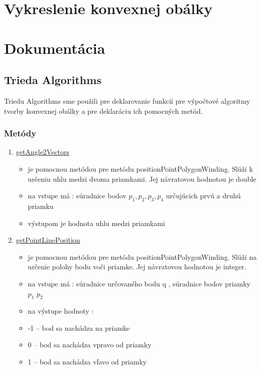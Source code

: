 \documentclass[12pt]{article}
\begin{document}

\section{Vykreslenie konvexnej obálky}




\section{Dokumentácia}
\subsection{Trieda Algorithms}
Triedu Algorithms sme použili pre deklarovanie funkcií pre výpočtové algoritmy tvorby konvexnej obálky a pre deklaráciu ich pomocných metód.

\subsubsection{Metódy}

\begin{enumerate}
\item[] \underline{getAngle2Vectors}
\begin{itemize}
\item je pomocnou metódou pre metódu positionPointPolygonWinding. Slúži k určeniu uhlu medzi dvoma priamkami. Jej návratovou hodnotou je double
\item na vstupe má : súradnice bodov $p_1, p_2, p_3, p_4$ určujúcich prvú a druhú priamku
\item výstupom je hodnota uhlu medzi priamkami 
\end{itemize}

\item[] \underline{getPointLinePosition}
\begin{itemize}
\item je pomocnou metódou pre metódu positionPointPolygonWinding. Slúži na určenie polohy bodu voči priamke. Jej návratovou hodnotou je integer.
\item na vstupe má : súradnice určovaného bodu q , súradnice bodov priamky $p_1$ $p_2$
\item na výstupe hodnoty :
\item[] -1 – bod sa nachádza na priamke
\item[] 0 – bod sa nachádza vpravo od priamky
\item[] 1 – bod sa nachádza vľavo od priamky
\end{itemize}
\end{enumerate}
\end{document}
